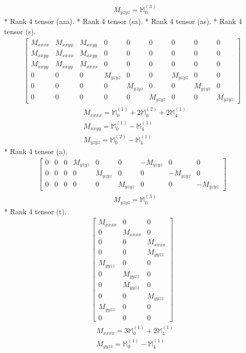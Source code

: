 \documentclass[fleqn,8pt,landscape]{jsarticle}
\begin{document}
\begin{align*}
& M_{yzyz} = \mathbb{M}_{0}^{(3)}
\end{align*}
* Rank 4 tensor (aaa).
* Rank 4 tensor (sa).
* Rank 4 tensor (as).
* Rank 4 tensor (s).
\begin{align*}
\begin{bmatrix} M_{xxxx} & M_{xxyy} & M_{xxyy} & 0 & 0 & 0 & 0 & 0 & 0 \\ M_{xxyy} & M_{xxxx} & M_{xxyy} & 0 & 0 & 0 & 0 & 0 & 0 \\ M_{xxyy} & M_{xxyy} & M_{xxxx} & 0 & 0 & 0 & 0 & 0 & 0 \\ 0 & 0 & 0 & M_{yzyz} & 0 & 0 & M_{yzyz} & 0 & 0 \\ 0 & 0 & 0 & 0 & M_{yzyz} & 0 & 0 & M_{yzyz} & 0 \\ 0 & 0 & 0 & 0 & 0 & M_{yzyz} & 0 & 0 & M_{yzyz} \end{bmatrix}
\end{align*}
\begin{align*}
& M_{xxxx} = \mathbb{M}_{0}^{(1)} + 2 \mathbb{M}_{0}^{(2)} + 2 \mathbb{M}_{4}^{(1)} \\
& M_{xxyy} = \mathbb{M}_{0}^{(1)} - \mathbb{M}_{4}^{(1)} \\
& M_{yzyz} = \mathbb{M}_{0}^{(2)} - \mathbb{M}_{4}^{(1)}
\end{align*}
* Rank 4 tensor (a).
\begin{align*}
\begin{bmatrix} 0 & 0 & 0 & M_{yzyz} & 0 & 0 & - M_{yzyz} & 0 & 0 \\ 0 & 0 & 0 & 0 & M_{yzyz} & 0 & 0 & - M_{yzyz} & 0 \\ 0 & 0 & 0 & 0 & 0 & M_{yzyz} & 0 & 0 & - M_{yzyz} \end{bmatrix}
\end{align*}
\begin{align*}
& M_{yzyz} = \mathbb{M}_{0}^{(3)}
\end{align*}
* Rank 4 tensor (t).
\begin{align*}
\begin{bmatrix} M_{xxxx} & 0 & 0 \\ 0 & M_{xxxx} & 0 \\ 0 & 0 & M_{xxxx} \\ 0 & 0 & M_{yyzz} \\ M_{yyzz} & 0 & 0 \\ 0 & M_{yyzz} & 0 \\ 0 & M_{yyzz} & 0 \\ 0 & 0 & M_{yyzz} \\ M_{yyzz} & 0 & 0 \\ 0 & 0 & 0 \end{bmatrix}
\end{align*}
\begin{align*}
& M_{xxxx} = 3 \mathbb{M}_{0}^{(1)} + 2 \mathbb{M}_{4}^{(1)} \\
& M_{yyzz} = \mathbb{M}_{0}^{(1)} - \mathbb{M}_{4}^{(1)}
\end{align*}
\end{document}
